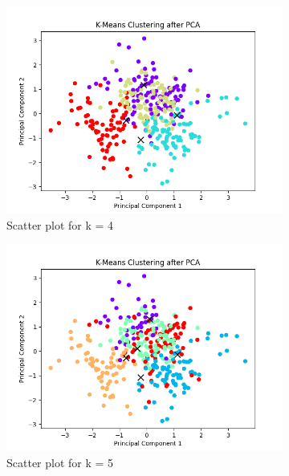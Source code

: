 \documentclass[12pt]{report}
\begin{document}
	\begin{figure}[H]
		\centering
		\begin{subfigure}{.5\textwidth}
			\centering
			\includegraphics[width=.9\linewidth]{../K-means/Output/Dataset1/scatterPlot_k=4.png}
			\caption{Scatter plot for k = 4}
			\label{Dataset1Scatterplotk4}
		\end{subfigure}%
		\begin{subfigure}{.5\textwidth}
			\centering
			\includegraphics[width=.9\linewidth]{../K-means/Output/Dataset1/scatterPlot_k=5.png}
			\caption{Scatter plot for k = 5}
			\label{Dataset1Scatterplotk5}
		\end{subfigure}
		\begin{subfigure}{.5\textwidth}%
			\centering

\end{subfigure}
\end{figure}
\end{document}
